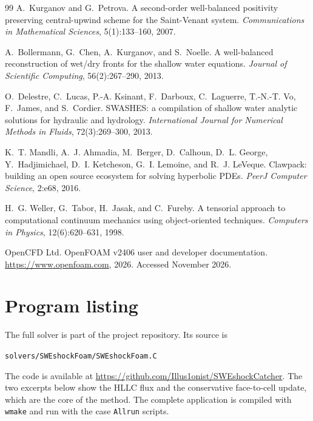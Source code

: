 ﻿\documentclass[11pt,a4paper]{article}
\begin{document}
\begin{thebibliography}{99}
A.~Kurganov and G.~Petrova.
\newblock A second-order well-balanced positivity preserving central-upwind
  scheme for the Saint-Venant system.
\newblock \emph{Communications in Mathematical Sciences}, 5(1):133--160, 2007.

A.~Bollermann, G.~Chen, A.~Kurganov, and S.~Noelle.
\newblock A well-balanced reconstruction of wet/dry fronts for the shallow water
  equations.
\newblock \emph{Journal of Scientific Computing}, 56(2):267--290, 2013.

O.~Delestre, C.~Lucas, P.-A. Ksinant, F.~Darboux, C.~Laguerre, T.-N.-T. Vo,
  F.~James, and S.~Cordier.
\newblock SWASHES: a compilation of shallow water analytic solutions for
  hydraulic and hydrology.
\newblock \emph{International Journal for Numerical Methods in Fluids},
  72(3):269--300, 2013.

K.~T. Mandli, A.~J. Ahmadia, M.~Berger, D.~Calhoun, D.~L. George,
  Y.~Hadjimichael, D.~I. Ketcheson, G.~I. Lemoine, and R.~J. LeVeque.
\newblock Clawpack: building an open source ecosystem for solving hyperbolic
  PDEs.
\newblock \emph{PeerJ Computer Science}, 2:e68, 2016.

H.~G. Weller, G.~Tabor, H.~Jasak, and C.~Fureby.
\newblock A tensorial approach to computational continuum mechanics using
  object-oriented techniques.
\newblock \emph{Computers in Physics}, 12(6):620--631, 1998.

OpenCFD Ltd.
\newblock OpenFOAM v2406 user and developer documentation.
\newblock \url{https://www.openfoam.com}, 2026.
\newblock Accessed November 2026.

\end{thebibliography}

\clearpage
\appendix
\section{Program listing}

The full solver is part of the project repository.  Its source is
\begin{center}
\texttt{solvers/SWEshockFoam/SWEshockFoam.C}
\end{center}
The code is available at
\url{https://github.com/Illus1onist/SWEshockCatcher}.
The two excerpts below
show the HLLC flux and the conservative face-to-cell update, which are the
core of the method.  The complete application is compiled with
\texttt{wmake} and run with the case \texttt{Allrun} scripts.
\end{document}

